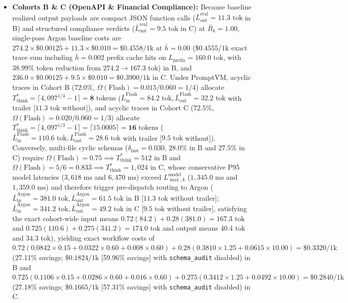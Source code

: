 \documentclass[conference,10pt]{IEEEtran}
\begin{document}
\begin{itemize}
    \item \textbf{Cohorts B \& C (OpenAPI \& Financial Compliance):} Because baseline realized output payloads are compact JSON function calls ($\bar{L}_{\text{out}}^{\text{real}} = 11.3\text{ tok}$ in B) and structured compliance verdicts ($\bar{L}_{\text{out}}^{\text{real}} = 9.5\text{ tok}$ in C) at $\bar{R}_k = 1.00$, single-pass Argon baseline costs are $274.2\times\$0.00125 + 11.3\times\$0.010 = \$0.4558/\text{1k}$ at $\bar{h}=0.00$ ($\$0.4555/\text{1k}$ exact trace sum including $\bar{h}=0.002$ prefix cache hits on $L_{\text{prefix}}=160.0\text{ tok}$, with $38.99\%$ token reduction from $274.2 \to 167.3\text{ tok}$) in B, and $236.0\times\$0.00125 + 9.5\times\$0.010 = \$0.3900/\text{1k}$ in C. Under PromptVM, acyclic traces in Cohort B ($72.0\%$, $\Omega(\text{Flash}) = 0.015/0.060 = 1/4$) allocate $T_{\text{think}}^* = \lceil 4{,}097^{1/4} - 1 \rceil = \mathbf{8}\text{ tokens}$ ($\bar{L}_{\text{in}}^{\text{Flash}} = 84.2\text{ tok}, \bar{L}_{\text{out}}^{\text{Flash}} = 32.2\text{ tok}$ with trailer [$11.3\text{ tok}$ without]), and acyclic traces in Cohort C ($72.5\%$, $\Omega(\text{Flash}) = 0.020/0.060 = 1/3$) allocate $T_{\text{think}}^* = \lceil 4{,}097^{1/3} - 1 \rceil = \lceil 15.0005 \rceil = \mathbf{16}\text{ tokens}$ ($\bar{L}_{\text{in}}^{\text{Flash}} = 110.6\text{ tok}, \bar{L}_{\text{out}}^{\text{Flash}} = 28.6\text{ tok}$ with trailer [$9.5\text{ tok}$ without]). Conversely, multi-file cyclic schemas ($\delta_{\text{inst}}=0.030$, $28.0\%$ in B and $27.5\%$ in C) require $\Omega(\text{Flash}) = 0.75 \implies T_{\text{think}}^* = 512$ in B and $\Omega(\text{Flash}) = 5/6 = 0.83\overline{3} \implies T_{\text{think}}^* = 1{,}024$ in C, whose conservative P95 model latencies ($3{,}618\text{ ms}$ and $6{,}470\text{ ms}$) exceed $L_{\max,k}^{\text{model}}$ ($1{,}345.0\text{ ms}$ and $1{,}359.0\text{ ms}$) and therefore trigger pre-dispatch routing to Argon ($\bar{L}_{\text{in}}^{\text{Argon}} = 381.0\text{ tok}, \bar{L}_{\text{out}}^{\text{Argon}} = 61.5\text{ tok}$ in B [$11.3\text{ tok}$ without trailer]; $\bar{L}_{\text{in}}^{\text{Argon}} = 341.2\text{ tok}, \bar{L}_{\text{out}}^{\text{Argon}} = 49.2\text{ tok}$ in C [$9.5\text{ tok}$ without trailer], satisfying the exact cohort-wide input means $0.72(84.2)+0.28(381.0)=167.3\text{ tok}$ and $0.725(110.6)+0.275(341.2)=174.0\text{ tok}$ and output means $40.4\text{ tok}$ and $34.3\text{ tok}$), yielding exact workflow costs of $0.72(0.0842\times 0.15 + 0.0322\times 0.60 + 0.008\times 0.60) + 0.28(0.3810\times 1.25 + 0.0615\times 10.00) = \$0.3320/\text{1k}$ (27.11\% savings; $\$0.1824/\text{1k}$ [59.96\% savings] with \texttt{schema\_audit} disabled) in B and $0.725(0.1106\times 0.15 + 0.0286\times 0.60 + 0.016\times 0.60) + 0.275(0.3412\times 1.25 + 0.0492\times 10.00) = \$0.2840/\text{1k}$ (27.18\% savings; $\$0.1665/\text{1k}$ [57.31\% savings] with \texttt{schema\_audit} disabled) in C.

\end{itemize}
\end{document}
